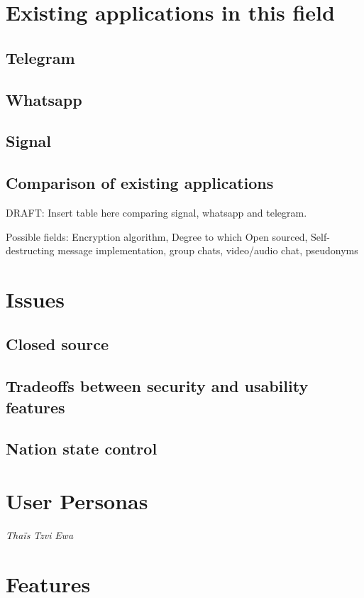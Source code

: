 \documentclass{mproj}
\begin{document}
\section{Existing applications in this field}
\subsection{Telegram}

\subsection{Whatsapp}

\subsection{Signal}

\subsection{Comparison of existing applications}
DRAFT: Insert table here comparing signal, whatsapp and telegram. 

Possible fields: Encryption algorithm, Degree to which Open sourced, Self-destructing message implementation, group chats, video/audio chat, pseudonyms  

\section{Issues}
\subsection{Closed source}
\subsection{Tradeoffs between security and usability features}
\subsection{Nation state control}

\section{User Personas}
\emph{Thaïs} 
\emph{Tzvi}
\emph{Ewa}

\section{Features}
\end{document}
